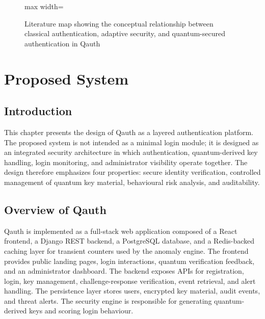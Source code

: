 \documentclass[12pt,a4paper]{report}
\begin{document}
\begin{figure}[H]
\begin{adjustbox}{max width=\textwidth}
\end{adjustbox}
\caption{Literature map showing the conceptual relationship between classical authentication, adaptive security, and quantum-secured authentication in Qauth}
\label{fig:literature-map}
\end{figure}


\chapter{Proposed System}

\section{Introduction}
This chapter presents the design of Qauth as a layered authentication platform. The proposed system is not intended as a minimal login module; it is designed as an integrated security architecture in which authentication, quantum-derived key handling, login monitoring, and administrator visibility operate together. The design therefore emphasizes four properties: secure identity verification, controlled management of quantum key material, behavioural risk analysis, and auditability.

\section{Overview of Qauth}
Qauth is implemented as a full-stack web application composed of a React frontend, a Django REST backend, a PostgreSQL database, and a Redis-backed caching layer for transient counters used by the anomaly engine. The frontend provides public landing pages, login interactions, quantum verification feedback, and an administrator dashboard. The backend exposes APIs for registration, login, key management, challenge-response verification, event retrieval, and alert handling. The persistence layer stores users, encrypted key material, audit events, and threat alerts. The security engine is responsible for generating quantum-derived keys and scoring login behaviour.
\end{document}
